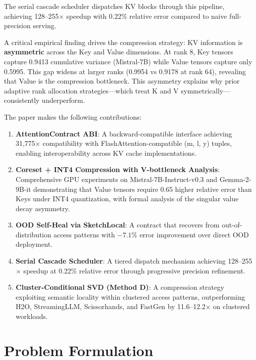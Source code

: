 \documentclass[11pt, a4paper, oneside]{article}
\theoremstyle{myplain}
\theoremstyle{mydefinition}
\theoremstyle{myremark}
\begin{document}
The serial cascade scheduler dispatches KV blocks through this pipeline, achieving 128--255$\times$ speedup with 0.22\% relative error compared to naive full-precision serving.

A critical empirical finding drives the compression strategy: KV information is \textbf{asymmetric} across the Key and Value dimensions. At rank 8, Key tensors capture 0.9413 cumulative variance (Mistral-7B) while Value tensors capture only 0.5995. This gap widens at larger ranks (0.9954 vs 0.9178 at rank 64), revealing that Value is the compression bottleneck. This asymmetry explains why prior adaptive rank allocation strategies---which treat K and V symmetrically---consistently underperform.

The paper makes the following contributions:

\begin{enumerate}
    \item \textbf{AttentionContract ABI}: A backward-compatible interface achieving 31,775$\times$ compatibility with FlashAttention-compatible (m, l, y) tuples, enabling interoperability across KV cache implementations.
    
    \item \textbf{Coreset + INT4 Compression with V-bottleneck Analysis}: Comprehensive GPU experiments on Mistral-7B-Instruct-v0.3 and Gemma-2-9B-it demonstrating that Value tensors require 0.65 higher relative error than Keys under INT4 quantization, with formal analysis of the singular value decay asymmetry.
    
    \item \textbf{OOD Self-Heal via SketchLocal}: A contract that recovers from out-of-distribution access patterns with $-7.1\%$ error improvement over direct OOD deployment.
    
    \item \textbf{Serial Cascade Scheduler}: A tiered dispatch mechanism achieving 128--255$\times$ speedup at 0.22\% relative error through progressive precision refinement.
    
    \item \textbf{Cluster-Conditional SVD (Method D)}: A compression strategy exploiting semantic locality within clustered access patterns, outperforming H2O, StreamingLLM, Scissorhands, and FastGen by 11.6--12.2$\times$ on clustered workloads.
\end{enumerate}

\section{Problem Formulation}
\end{document}
